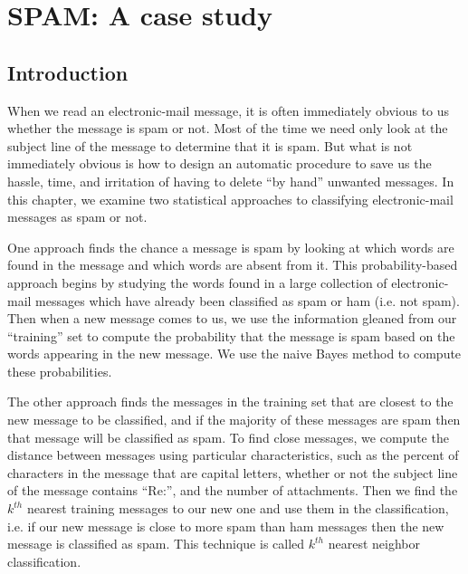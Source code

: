 \def\Title#1{\textit{#1}}
\def\SCode#1{\Rcode{#1}}
\def\SVariableName#1{\Svar{#1}}
\def\SValue#1{\texttt{#1}}
\def\Email#1{\texttt{#1}}
\def\TabChar{\\t}
\def\NewLineChar{\\n}


\chapter{SPAM: A case study}
\section{Introduction}
 
When we read an electronic-mail message, it is often immediately
obvious to us whether the message is spam or not.  Most of the time we
need only look at the subject line of the message to determine that it
is spam.  But what is not immediately obvious is how to design an
automatic procedure to save us the hassle, time, and irritation of
having to delete ``by hand'' unwanted messages.  In this chapter, we
examine two statistical approaches to classifying electronic-mail
messages as spam or not.

One approach finds the chance a message is spam by looking at which
words are found in the message and which words are absent from it.
This probability-based approach begins by studying the words found in
a large collection of electronic-mail messages which have already been
classified as spam or ham (i.e. not spam).  Then when a new message
comes to us, we use the information gleaned from our ``training'' set
to compute the probability that the message is spam based on the words
appearing in the new message.  We use the naive Bayes method to
compute these probabilities.

The other approach finds the messages in the training set that are
closest to the new message to be classified, and if the majority of
these messages are spam then that message will be classified as spam.
To find close messages, we compute the distance between messages using
particular characteristics, such as the percent of characters in the
message that are capital letters, whether or not the subject line of
the message contains ``Re:'', and the number of attachments.  Then we
find the $k^{th}$ nearest training messages to our new one and use
them in the classification, i.e. if our new message is close to more
spam than ham messages then the new message is classified as spam.
This technique is called $k^{th}$ nearest neighbor classification.

